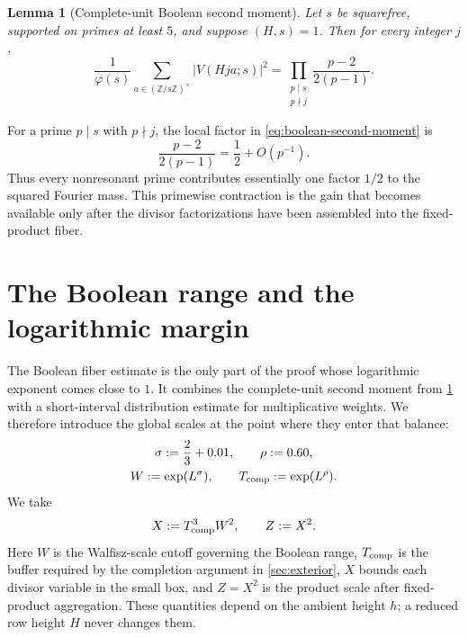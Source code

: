 \documentclass[11pt]{article}
\newtheorem{lemma}[lemma]{Lemma}
\theoremstyle{definition}
\theoremstyle{remark}
\newcommand{\1}{\mathbf 1}
\newcommand{\ph}{\varphi}
\begin{document}
\begin{lemma}[Complete-unit Boolean second moment]\label{lem:boolean-second-moment}
Let $s$ be squarefree, supported on primes at least $5$, and suppose $(H,s)=1$.  Then for every integer $j$,
\begin{equation}\label{eq:boolean-second-moment}
\frac1{\ph(s)}\sum_{a\in(\mathbb Z/s\mathbb Z)^\times}
 |V(Hja;s)|^2
 =\prod_{\substack{p\mid s\\p\nmid j}}
 \frac{p-2}{2(p-1)}.
\end{equation}
\end{lemma}

For a prime $p\mid s$ with $p\nmid j$, the local factor in \cref{eq:boolean-second-moment} is
\[
\frac{p-2}{2(p-1)}=\frac12+O(p^{-1}).
\]
Thus every nonresonant prime contributes essentially one factor $1/2$ to the squared Fourier mass.  This primewise contraction is the gain that becomes available only after the divisor factorizations have been assembled into the fixed-product fiber.

\section{The Boolean range and the logarithmic margin}\label{sec:shiu-small-box}

The Boolean fiber estimate is the only part of the proof whose logarithmic exponent comes close to $1$.  It combines the complete-unit second moment from \cref{lem:boolean-second-moment} with a short-interval distribution estimate for multiplicative weights.  We therefore introduce the global scales at the point where they enter that balance:
\begin{equation}
\begin{gathered}
\sigma:=\frac23+0.01,
\qquad
\rho:=0.60,\\
W:=\exp(L^\sigma),
\qquad
T_{\rm comp}:=\exp(L^\rho).
\end{gathered}
\label{eq:global-parameters}
\end{equation}
We take
\begin{equation}
X:=T_{\rm comp}^{3}W^2,\qquad Z:=X^2.
\label{eq:XZ}
\end{equation}
Here $W$ is the Walfisz-scale cutoff governing the Boolean range, $T_{\rm comp}$ is the buffer required by the completion argument in \cref{sec:exterior}, $X$ bounds each divisor variable in the small box, and $Z=X^2$ is the product scale after fixed-product aggregation.  These quantities depend on the ambient height $h$; a reduced row height $H$ never changes them.
\end{document}
